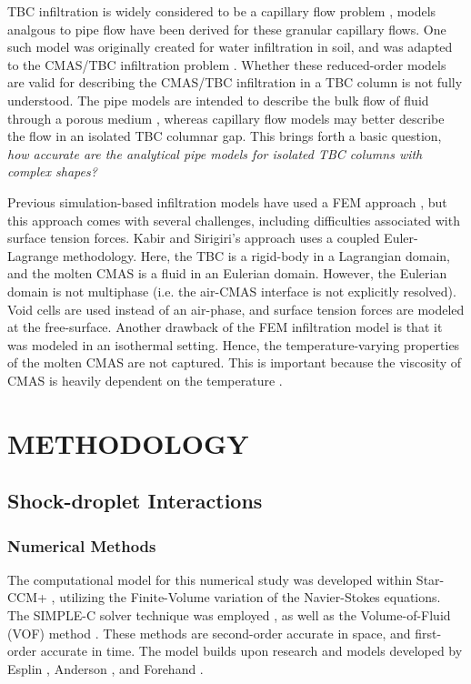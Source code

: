 \documentclass{UCF_ETD}
\begin{document}
TBC infiltration is widely considered to be a capillary flow problem \cite{Naraparaju2017}, models analgous to pipe flow have been derived for these granular capillary flows. One such model was originally created for water infiltration in soil, and was adapted to the CMAS/TBC infiltration problem \cite{CARMAN1997S32, Chapuis2003616, Naraparaju2019}. Whether these reduced-order models are valid for describing the CMAS/TBC infiltration in a TBC column is not fully understood. The pipe models are intended to describe the bulk flow of fluid through a porous medium \cite{Naraparaju2017}, whereas capillary flow models may better describe the flow in an isolated TBC columnar gap. This brings forth a basic question, \textit{how accurate are the analytical pipe models for isolated TBC columns with complex shapes?}

Previous simulation-based infiltration models have used a FEM approach \cite{Kabir, Sirigiri2018}, but this approach comes with several challenges, including difficulties associated with surface tension forces. Kabir and Sirigiri's approach uses a coupled Euler-Lagrange methodology. Here, the TBC is a rigid-body in a Lagrangian domain, and the molten CMAS is a fluid in an Eulerian domain. However, the Eulerian domain is not multiphase (i.e. the air-CMAS interface is not explicitly resolved). Void cells are used instead of an air-phase, and surface tension forces are modeled at the free-surface. Another drawback of the FEM infiltration model is that it was modeled in an isothermal setting. Hence, the temperature-varying properties of the molten CMAS are not captured. This is important because the viscosity of CMAS is heavily dependent on the temperature \cite{Naraparaju2019}.


\chapter{METHODOLOGY}

\section{Shock-droplet Interactions}
\label{sec:shock-droplet_method}
\subsection{Numerical Methods}
\label{sec:DropletnumericalMethods}
The computational model for this numerical study was developed within Star-CCM+ \cite{starccm}, utilizing the Finite-Volume variation of the Navier-Stokes equations. The SIMPLE-C solver technique was employed \cite{SIMPLEC}, as well as the Volume-of-Fluid (VOF) method \cite{HIRT1981201}. These methods are second-order accurate in space, and first-order accurate in time. The model builds upon research and models developed by Esplin \cite{Esplin2016,esplin2016bulk}, Anderson \cite{Andersom2020}, and Forehand \cite{Forehand2024}. 
\end{document}
